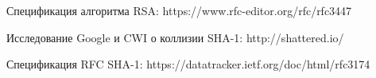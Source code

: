 
\begin{thebibliography}{3}
Спецификация алгоритма RSA: https://www.rfc-editor.org/rfc/rfc3447

Исследование Google и CWI о коллизии SHA-1: http://shattered.io/

Спецификация RFC SHA-1: https://datatracker.ietf.org/doc/html/rfc3174
\end{thebibliography}